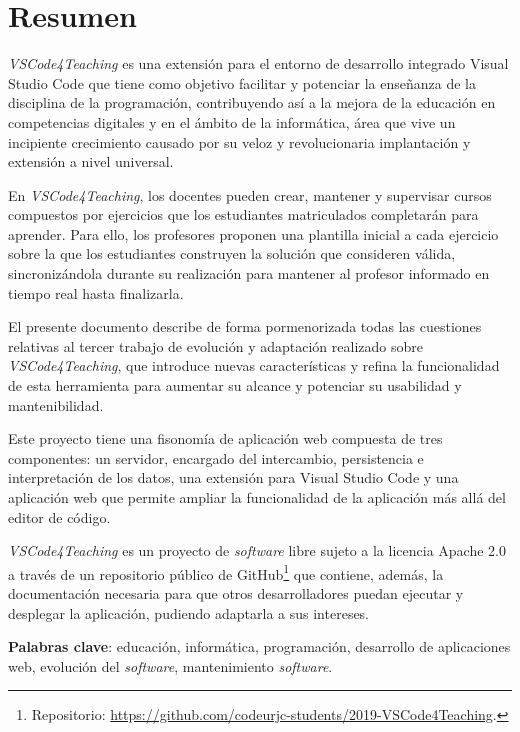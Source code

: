 \chapter*{Resumen}

\textit{VSCode4Teaching} es una extensión para el entorno de desarrollo integrado Visual Studio Code que tiene como objetivo facilitar y potenciar la enseñanza de la disciplina de la programación, contribuyendo así a la mejora de la educación en competencias digitales y en el ámbito de la informática, área que vive un incipiente crecimiento causado por su veloz y revolucionaria implantación y extensión a nivel universal.

En \textit{VSCode4Teaching}, los docentes pueden crear, mantener y supervisar cursos compuestos por ejercicios que los estudiantes matriculados completarán para aprender. Para ello, los profesores proponen una plantilla inicial a cada ejercicio sobre la que los estudiantes construyen la solución que consideren válida, sincronizándola durante su realización para mantener al profesor informado en tiempo real hasta finalizarla.

El presente documento describe de forma pormenorizada todas las cuestiones relativas al tercer trabajo de evolución y adaptación realizado sobre \textit{VSCode4Teaching}, que introduce nuevas características y refina la funcionalidad de esta herramienta para aumentar su alcance y potenciar su usabilidad y mantenibilidad.

Este proyecto tiene una fisonomía de aplicación web compuesta de tres componentes: un servidor, encargado del intercambio, persistencia e interpretación de los datos, una extensión para Visual Studio Code y una aplicación web que permite ampliar la funcionalidad de la aplicación más allá del editor de código.

\textit{VSCode4Teaching} es un proyecto de \textit{software} libre sujeto a la licencia Apache 2.0 a través de un repositorio público de GitHub\footnote{Repositorio: \href{https://github.com/codeurjc-students/2019-VSCode4Teaching}{https://github.com/codeurjc-students/2019-VSCode4Teaching}.} que contiene, además, la documentación necesaria para que otros desarrolladores puedan ejecutar y desplegar la aplicación, pudiendo adaptarla a sus intereses.

\vspace{2pt}

\noindent \textbf{Palabras clave}: educación, informática, programación, desarrollo de aplicaciones web, evolución del \textit{software}, mantenimiento \textit{software}.


